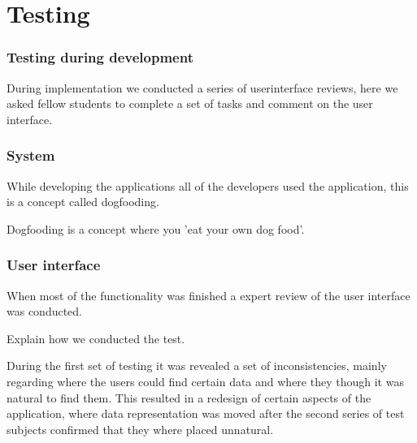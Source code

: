 \chapter{Testing}
\subsection{Testing during development}
During implementation we conducted a series of userinterface reviews, here we asked fellow students to complete a set of tasks and comment on the user interface. 

\subsection{System}
While developing the applications all of the developers used the application, this is a concept called dogfooding.

Dogfooding is a concept where you 'eat your own dog food'.

\subsection{User interface}
When most of the functionality was finished a expert review of the user interface was conducted.

Explain how we conducted the test.

During the first set of testing it was revealed a set of inconsistencies, mainly regarding where the users could find certain data and where they though it was natural to find them. 
This resulted in a redesign of certain aspects of the application, where data representation was moved after the second series of test subjects confirmed that they where placed unnatural.
